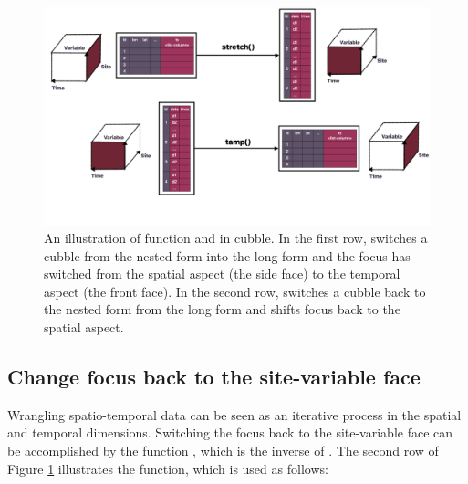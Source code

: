 \documentclass[
]{jss}
\begin{document}
\begin{CodeChunk}
\begin{figure}

{\centering \includegraphics[width=1\linewidth]{../figures/diagram-keynotes/diagram-keynotes.002} 

}

\caption{An illustration of function  and  in cubble. In the first row,  switches a cubble from the nested form into the long form and the focus has switched from the spatial aspect (the side face) to the temporal aspect (the front face). In the second row,  switches a cubble back to the nested form from the long form and shifts focus back to the spatial aspect.}\label{fig:face}
\end{figure}
\end{CodeChunk}

\hypertarget{change-focus-back-to-the-site-variable-face}{%
\subsection{Change focus back to the site-variable face}\label{change-focus-back-to-the-site-variable-face}}

Wrangling spatio-temporal data can be seen as an iterative process in the spatial and temporal dimensions. Switching the focus back to the site-variable face can be accomplished by the function , which is the inverse of . The second row of Figure \ref{fig:face} illustrates the function, which is used as follows:
\end{document}

